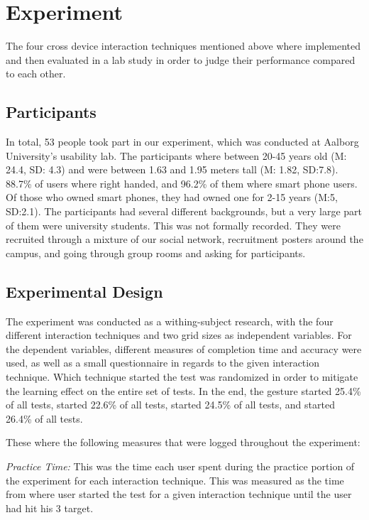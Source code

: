 \section{Experiment}
The four cross device interaction techniques mentioned above where implemented and then evaluated in a lab study in order to judge their performance compared to each other.

\subsection{Participants}
In total, 53 people took part in our experiment, which was conducted at Aalborg University's usability lab. The participants where between 20-45 years old (M: 24.4, SD: 4.3) and were between 1.63 and 1.95 meters tall (M: 1.82, SD:7.8). 88.7\% of users where right handed, and 96.2\% of them where smart phone users. Of those who owned smart phones, they had owned one for 2-15 years (M:5, SD:2.1). The participants had several different backgrounds, but a very large part of them were university students. This was not formally recorded. They were recruited through a mixture of our social network, recruitment posters around the campus, and going through group rooms and asking for participants. 

\subsection{Experimental Design}
The experiment was conducted as a withing-subject research, with the four different interaction techniques and two grid sizes as independent variables. For the dependent variables, different measures of completion time and accuracy were used, as well as a small questionnaire in regards to the given interaction technique. Which technique started the test was randomized in order to mitigate the learning effect on the entire set of tests. In the end, the \pinch gesture started 25.4\% of all tests, \swipe started 22.6\% of all tests, \throw started 24.5\% of all tests, and \tilt started 26.4\% of all tests.

These where the following measures that were logged throughout the experiment: 

\textit{Practice Time:} This was the time each user spent during the practice portion of the experiment for each interaction technique. This was measured as the time from where user started the test for a given interaction technique until the user had hit his 3 target. 

